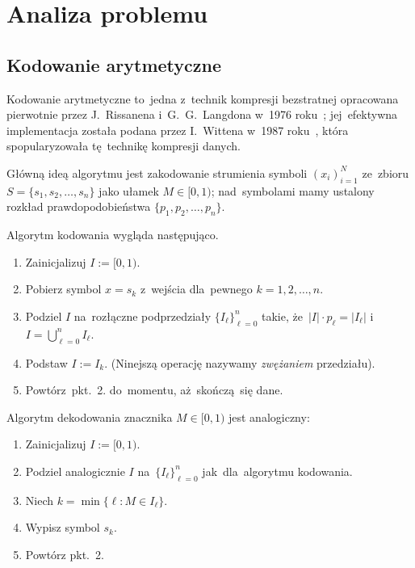 \documentclass[../../praca.tex]{subfiles}
\begin{document}
\chapter{Analiza problemu}

\section{Kodowanie arytmetyczne}

Kodowanie arytmetyczne to~jedna z~technik kompresji bezstratnej
opracowana pierwotnie przez J.~Rissanena i~G.~G.~Langdona w~1976 roku~\cite{Rissanen:AC};
jej~efektywna implementacja została podana przez I.~Wittena w~1987 roku~\cite{Witten:AC},
która spopularyzowała tę~technikę kompresji danych.

Główną ideą algorytmu jest zakodowanie strumienia symboli \( (x_i)_{i = 1}^N \)
ze~zbioru \( S = \{ s_1, s_2, \dotsc, s_n \} \) jako ułamek \( M \in [0, 1) \);
nad~symbolami mamy ustalony rozkład prawdopodobieństwa \( \{ p_1, p_2, \dotsc, p_n \} \).

Algorytm kodowania wygląda następująco.
\begin{enumerate}
  \item Zainicjalizuj \( I := [0, 1) \).
  \item Pobierz symbol \( x = s_k \) z~wejścia dla~pewnego \( k = 1, 2, \dotsc, n \).
  \item Podziel \( I \) na~rozłączne podprzedziały \( \{ I_\ell \}_{\ell = 0}^n \) takie, 
    że~\( |I| \cdot p_\ell = |I_\ell| \) i~\( I = \bigcup_{\ell = 0}^n I_\ell \).
  \item Podstaw \( I := I_k \). (Ninejszą operację nazywamy \emph{zwężaniem} przedziału).
  \item Powtórz~pkt.~2. do~momentu, aż~skończą~się dane.
\end{enumerate}

Algorytm dekodowania znacznika \( M \in [0, 1) \) jest analogiczny:
\begin{enumerate}
  \item Zainicjalizuj \( I := [0, 1) \).
  \item Podziel analogicznie \( I \) na~\( \{ I_\ell \}_{\ell = 0}^n \) 
    jak~dla~algorytmu kodowania.
  \item Niech \( k = \min \{ \ell : M \in I_\ell \} \).
  \item Wypisz symbol \( s_k \).
  \item Powtórz pkt.~2.
\end{enumerate}
\end{document}
